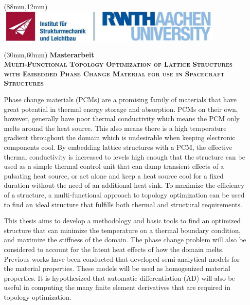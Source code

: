 \begin{textblock*}{\linewidth}(88mm,12mm)
	\includegraphics*[height=16mm]{./figures/rwth_sla}
\end{textblock*}

\begin{textblock*}{\textwidth}(30mm,60mm)
	\centering
	{\bfseries Masterarbeit} \\[1ex]
	\bfseries\scshape 
		Multi-Functional Topology Optimization of Lattice Structures with Embedded Phase Change Material for use in Spacecraft Structures 
	\par
\end{textblock*}
\vspace*{40mm}

Phase change materials (PCMs) are a promising family of materials that have great potential in thermal energy storage and absorption. PCMs on their own, however, generally have poor thermal conductivity which means the PCM only melts around the heat source. This also means there is a high temperature gradient throughout the domain which is undesirable when keeping electronic components cool. By embedding lattice structures with a PCM, the effective thermal conductivity is increased to levels high enough that the structure can be used as a simple thermal control unit that can damp transient effects of a pulsating heat source, or act alone and keep a heat source cool for a fixed duration without the need of an additional heat sink. To maximize the efficiency of a structure, a multi-functional approach to topology optimization can be used to find an ideal structure that fulfills both thermal and structural requirements.

This thesis aims to develop a methodology and basic tools to find an optimized structure that can minimize the temperature on a thermal boundary condition, and maximize the stiffness of the domain. The phase change problem will also be considered to account for the latent heat effects of how the domain melts. Previous works have been conducted that developed semi-analytical models for the material properties. These models will be used as homogenized material properties. It is hypothesized that automatic differentiation (AD) will also be useful in computing the many finite element derivatives that are required in topology optimization. 